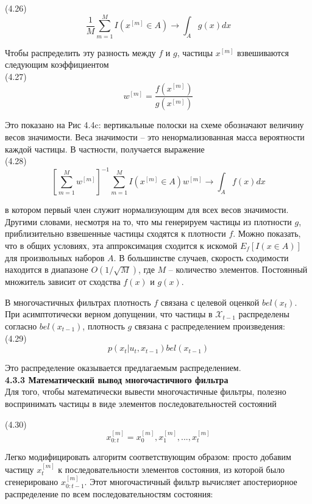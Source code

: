 \documentclass[10pt,a4paper]{article}
\begin{document}
(4.26)
$$\frac{1}{M}\sum_{m=1}^M I(x^{[m]}\in A)\longrightarrow\int_A g(x)dx$$

Чтобы распределить эту разность между $f$ и $g$, частицы $x^{[m]}$  взвешиваются следующим коэффициентом\\

(4.27)
$$w^{[m]}=\frac{f(x^{[m]})}{g(x^{[m]})}$$

Это показано на Рис 4.4c: вертикальные полоски на схеме обозначают величину весов значимости. Веса значимости – это ненормализованная масса вероятности каждой частицы. В частности, получается выражение\\

(4.28)
$$\left[ \sum_{m=1}^M w^{[m]}\right] ^{-1}\sum_{m=1}^M I(x^{[m]}\in A)w^{[m]}\longrightarrow\int_A f(x)dx$$

в котором первый член служит нормализующим для всех весов значимости. Другими словами, несмотря на то, что мы генерируем частицы из плотности $g$, приблизительно взвешенные частицы сходятся к плотности $f$. Можно показать, что в общих условиях, эта аппроксимация сходится к искомой $E_f[I(x\in A)]$ для произвольных наборов $A$. В большинстве случаев, скорость сходимости находится в диапазоне $O(1/\sqrt{M})$, где $M$ – количество элементов. Постоянный множитель зависит от сходства $f(x)$ и $g(x)$.

В многочастичных фильтрах плотность $f$ связана с целевой оценкой $bel(x_t)$.
При асимптотически верном допущении, что частицы в $\mathcal X_{t-1}$ распределены согласно $bel(x_{t-1})$, плотность $g$ связана с распределением произведения:\\

(4.29)
$$p(x_t|u_t,x_{t-1}) bel(x_{t-1})$$

Это распределение оказывается предлагаемым распределением.\\

\textbf{4.3.3 Математический вывод многочастичного фильтра}\\

Для того, чтобы математически вывести многочастичные фильтры, полезно воспринимать частицы в виде элементов последовательностей состояний 

(4.30)
$$x_{0:t}^{[m]}=x_0^{[m]},x_1^{[m]},...,x_t^{[m]}$$

Легко модифицировать алгоритм соответствующим образом: просто добавим частицу
$x_t^{[m]}$ к последовательности элементов состояния, из которой было сгенерировано $x_{0:t-1}^{[m]}$. Этот многочастичный фильтр вычисляет апостериорное распределение по всем последовательностям состояния:\\
\end{document}

